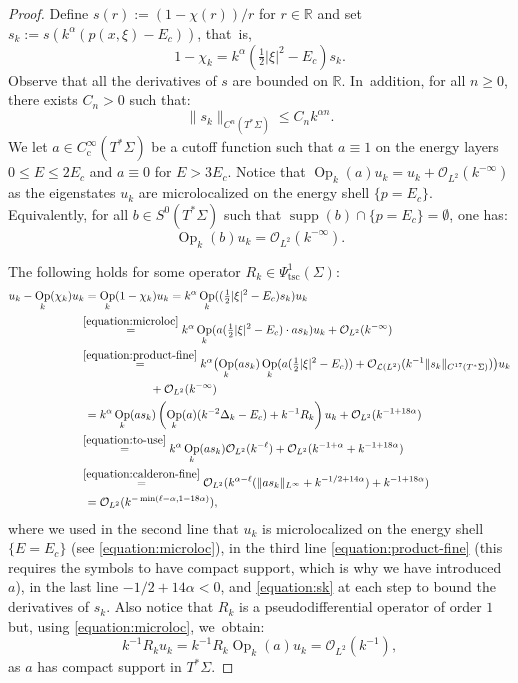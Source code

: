 \documentclass[JEP,XML,SOM,Unicode,published]{cedram}
\theoremstyle{plain}
\theoremstyle{definition}
\let\mc\mathcal
\newcommand{\R}{\mathbb{R}}
\DeclareMathOperator{\comp}{c}
\DeclareMathOperator{\Op}{Op}
\DeclareMathOperator{\supp}{supp}
\begin{document}
\begin{proof}
Define $s(r) \!:=\! (1-\chi(r))/r$ for $r \!\in\! \R$ and set $s_k \!:=\! s(k^\alpha(p(x,\xi)-E_c))$, that~is,
\[
1-\chi_k = k^\alpha (\tfrac{1}{2}|\xi|^2-E_c) s_k.
\]
Observe that all the derivatives of $s$ are bounded on $\R$. In~addition, for all $n \geq 0$, there exists $C_n > 0$ such that:
\begin{equation}
\label{equation:sk}
\|s_k\|_{C^n(T^*\Sigma)} \leq C_n k^{\alpha n}.
\end{equation}
We let $a \in C^\infty_{\comp}(T^*\Sigma)$ be a cutoff function such that $a \equiv 1$ on the energy layers $0 \leq E \leq 2 E_c$ and $a \equiv 0$ for $E > 3E_c$. Notice that $\Op_k(a)u_k = u_k + \mc{O}_{L^2}(k^{-\infty})$ as the eigenstates $u_k$ are microlocalized on the energy shell $\{p=E_c\}$. Equivalently, for all $b \in S^0(T^*\Sigma)$ such that $\supp(b) \cap \{p=E_c\}=\emptyset$, one has:
\begin{equation}
\label{equation:microloc}\Op_k(b)u_k = \mc{O}_{L^2}(k^{-\infty}).
\end{equation}

The following holds for some operator $R_k \in \Psi^1_{\mathrm{tsc}}(\Sigma)$:
\[
\begin{split}
u_k - \Op_k(\chi_k)u_k
& = \Op_k(1-\chi_k) u_k = k^\alpha \Op_k((\tfrac{1}{2}|\xi|^2-E_c)s_k) u_k \\ &
\mkern-7mu\overset{\eqref{equation:microloc}}{=} k^\alpha \Op_k(a(\tfrac{1}{2}|\xi|^2-E_c) \cdot a s_k) u_k + \mc{O}_{L^2}(k^{-\infty}) \\
& \mkern-7mu\overset{\eqref{equation:product-fine}}{=} k^\alpha \bigl(\Op_k(a s_k) \Op_k(a (\tfrac{1}{2}|\xi|^2-E_c)) + \mc{O}_{\mc{L}(L^2)}(k^{-1}\|s_k\|_{C^{17}(T^*\Sigma)})\bigr) u_k \\
& \hspace{2cm} + \mc{O}_{L^2}(k^{-\infty}) \\
& = k^{\alpha} \Op_k(a s_k) \left(\Op_k(a)(k^{-2}\Delta_k - E_c) + k^{-1} R_k\right) u_k + \mc{O}_{L^2}(k^{-1+18\alpha}) \\
& \mkern-7mu\overset{\eqref{equation:to-use}}{=} k^{\alpha} \Op_k(as_k) \mc{O}_{L^2}(k^{-\ell}) + \mc{O}_{L^2}(k^{-1+\alpha} + k^{-1+18\alpha}) \\
& \mkern-7mu\overset{\eqref{equation:calderon-fine}}{=} \mc{O}_{L^2}(k^{\alpha-\ell}(\|as_k\|_{L^\infty}+k^{-1/2+14\alpha}) +
k^{-1+18\alpha})\\
& = \mc{O}_{L^2}(k^{-\min(\ell-\alpha,1-18\alpha)}),
\end{split}
\]
where we used in the second line that $u_k$ is microlocalized on the energy
shell $\{E = E_c\}$ (see \eqref{equation:microloc}), in the third line \eqref{equation:product-fine}
(this requires the symbols to have compact support, which is why we have
introduced $a$), in the last line $-1/2+14\alpha < 0$, and \eqref{equation:sk} at each step to bound the derivatives of $s_k$. Also notice that $R_k$ is a pseudodifferential operator of order $1$ but, using \eqref{equation:microloc}, we~obtain:
\[
k^{-1} R_k u_k = k^{-1} R_k \Op_k(a) u_k = \mc{O}_{L^2}(k^{-1}),
\]
as $a$ has compact support in $T^*\Sigma$.
\end{proof}
\end{document}
